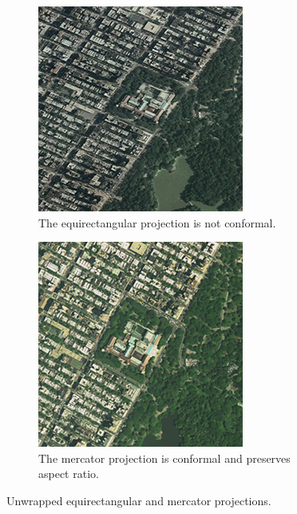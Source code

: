 \begin{figure}[htbp]
    \centering
    \begin{subfigure}[bt]{0.3\textwidth}
        \includegraphics[width=\textwidth]{figures/central_park_equirectangular.png}
	\caption{The equirectangular projection is not conformal.}
    \end{subfigure}
    \qquad
    \begin{subfigure}[bt]{0.3\textwidth}
        \includegraphics[width=\textwidth]{figures/central_park_mercator.png}
        \caption{The mercator projection is conformal and preserves aspect ratio.}
    \end{subfigure}
    \caption{Unwrapped equirectangular and mercator projections.}
    \label{fig:mercator}
\end{figure}

